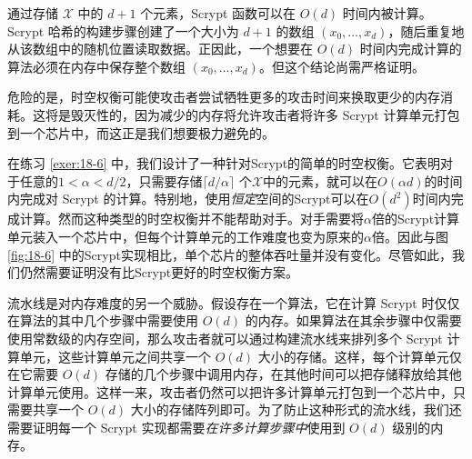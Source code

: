 \begin{snote}
通过存储 $\mathcal{X}$ 中的 $d+1$ 个元素，Scrypt 函数可以在 $O(d)$ 时间内被计算。Scrypt 哈希的构建步骤创建了一个大小为 $d+1$ 的数组 $(x_0,\dots,x_d)$，随后重复地从该数组中的随机位置读取数据。正因此，一个想要在 $O(d)$ 时间内完成计算的算法必须在内存中保存整个数组 $(x_0,\dots,x_d)$。但这个结论尚需严格证明。

危险的是，时空权衡可能使攻击者尝试牺牲更多的攻击时间来换取更少的内存消耗。这将是毁灭性的，因为减少的内存将允许攻击者将许多 Scrypt 计算单元打包到一个芯片中，而这正是我们想要极力避免的。

在练习 \ref{exer:18-6} 中，我们设计了一种针对Scrypt的简单的时空权衡。它表明对于任意的$1<\alpha<d/2$，只需要存储$\lceil d/\alpha\rceil$ 个$\mathcal{X}$中的元素，就可以在$O(\alpha d)$的时间内完成对 Scrypt 的计算。特别地，使用\emph{恒定}空间的Scrypt可以在$O(d^2)$时间内完成计算。然而这种类型的时空权衡并不能帮助对手。对手需要将$\alpha$倍的Scrypt计算单元装入一个芯片中，但每个计算单元的工作难度也变为原来的$\alpha$倍。因此与图 \ref{fig:18-6} 中的Scrypt实现相比，单个芯片的整体吞吐量并没有变化。尽管如此，我们仍然需要证明没有比Scrypt更好的时空权衡方案。

流水线是对内存难度的另一个威胁。假设存在一个算法，它在计算 Scrypt 时仅仅在算法的其中几个步骤中需要使用 $O(d)$ 的内存。如果算法在其余步骤中仅需要使用常数级的内存空间，那么攻击者就可以通过构建流水线来排列多个 Scrypt 计算单元，这些计算单元之间共享一个 $O(d)$ 大小的存储。这样，每个计算单元仅在它需要 $O(d)$ 存储的几个步骤中调用内存，在其他时间可以把存储释放给其他计算单元使用。这样一来，攻击者仍然可以把许多计算单元打包到一个芯片中，只需要共享一个 $O(d)$ 大小的存储阵列即可。为了防止这种形式的流水线，我们还需要证明每一个 Scrypt 实现都需要\emph{在许多计算步骤中}使用到 $O(d)$ 级别的内存。
\end{snote}

